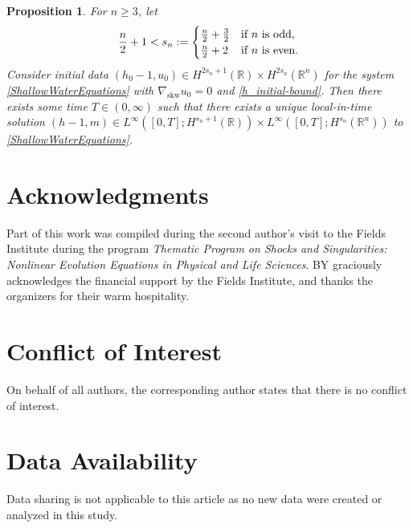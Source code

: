 \documentclass[reqno,11pt]{amsart}
\theoremstyle{plain}
\newtheorem{proposition}[theorem]{Proposition}
\theoremstyle{definition}
\numberwithin{equation}{section}
\begin{document}
\begin{proposition}
    \label{prop:n-d}
    For $ n \geq 3 $, let 
    \begin{equation}
    \label{def:s-for-n-d}
        \frac{n}{2}+1 < s_n:= \begin{cases}
            \frac{n}{2}+ \frac{3}{2} & \text{if $ n $ is odd}, \\
            \frac{n}{2}+2 & \text{if $ n $ is even}.
        \end{cases}
    \end{equation}
    Consider initial data $ (h_0-1, u_0) \in H^{2 s_n+1}(\mathbb R) \times H^{2 s_n}(\mathbb R^n) $ for the system \eqref{ShallowWaterEquations} with $ \nabla_\mathrm{skw} u_0 = 0 $ and \eqref{h_initial-bound}. Then there exists some time $T\in (0,\infty)$ such that there exists a unique local-in-time solution $(h-1,m)\in L^{\infty}([0,T];H^{s_n+1}(\mathbb{R}))\times L^{\infty}([0,T];H^{s_n}(\mathbb{R}^n))$ to \eqref{ShallowWaterEquations}.
\end{proposition}


\section*{Acknowledgments}
Part of this work was compiled during the second author's visit to the Fields Institute during the program \emph{Thematic Program on Shocks and Singularities: Nonlinear Evolution Equations in Physical and Life Sciences}. BY graciously acknowledges the financial support by the Fields Institute, and thanks the organizers for their warm hospitality. 

\section*{Conflict of Interest}
On behalf of all authors, the corresponding author states that there is no conflict of interest.

\section*{Data Availability}
Data sharing is not applicable to this article as no new data were created or analyzed in this study.



\end{document}
